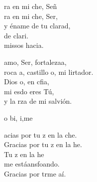 \documentclass[12pt]{article}
\begin{document}
\begin{multicols*}{2}
\begin{cancion}%
	ra en mi che, Señ \\
	ra en mi che, Ser,\\
	y éname de tu clarad, \\
	de clari.\\
	missos hacia.\\
\end{cancion}%

\begin{cancion}%
	 amo, Ser, fortalezaa, \\
	roca a, castillo o, mi lirtador. \\
	Dios o, en cfia, \\
	mi esdo eres Tú,\\
	y la rza de mi salvión.\\
\end{cancion}%

\begin{cancion}%
	o bi, i,me\\
\end{cancion}%

\begin{cancion}%
	acias por tu z en la che.\\
	Gracias por tu z en la he.\\
	Tu z en la he \\
	me estáansfoando.\\
	Gracias por trme aí.\\
\end{cancion}%


\end{multicols*}
\end{document}
